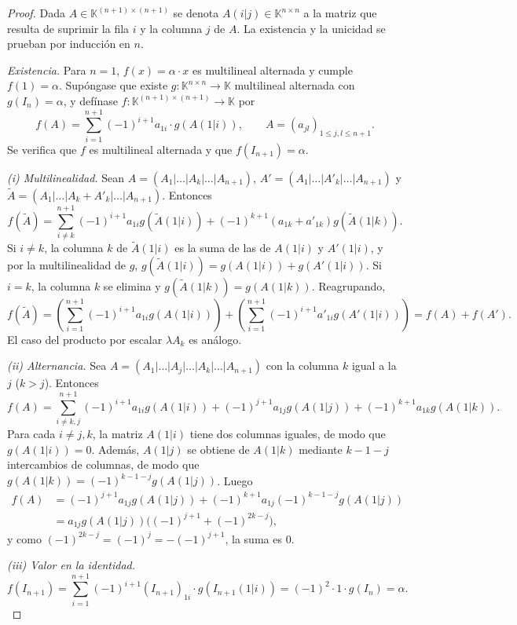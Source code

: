 \documentclass[11pt, a4paper]{article}
\begin{document}
\begin{proof}
Dada $A \in \mathbb{K}^{(n+1) \times (n+1)}$ se denota $A(i|j) \in \mathbb{K}^{n \times n}$ a la matriz que resulta de suprimir la fila $i$ y la columna $j$ de $A$. La existencia y la unicidad se prueban por inducción en $n$.

\textit{Existencia.} Para $n=1$, $f(x) = \alpha \cdot x$ es multilineal alternada y cumple $f(1) = \alpha$. Supóngase que existe $g: \mathbb{K}^{n \times n} \to \mathbb{K}$ multilineal alternada con $g(I_n) = \alpha$, y defínase $f: \mathbb{K}^{(n+1) \times (n+1)} \to \mathbb{K}$ por
\[
f(A) = \sum_{i=1}^{n+1} (-1)^{i+1} a_{1i} \cdot g(A(1|i)), \qquad A=(a_{jl})_{1 \le j,l \le n+1}.
\]
Se verifica que $f$ es multilineal alternada y que $f(I_{n+1}) = \alpha$.

\textit{(i) Multilinealidad.} Sean $A = (A_1|\dots|A_k|\dots|A_{n+1})$, $A' = (A_1|\dots|A'_k|\dots|A_{n+1})$ y $\tilde{A} = (A_1|\dots|A_k+A'_k|\dots|A_{n+1})$. Entonces
\[
f(\tilde{A}) = \sum_{i \neq k}^{n+1} (-1)^{i+1} a_{1i} g(\tilde{A}(1|i)) + (-1)^{k+1} (a_{1k} + a'_{1k}) g(\tilde{A}(1|k)).
\]
Si $i \neq k$, la columna $k$ de $\tilde{A}(1|i)$ es la suma de las de $A(1|i)$ y $A'(1|i)$, y por la multilinealidad de $g$, $g(\tilde{A}(1|i)) = g(A(1|i)) + g(A'(1|i))$. Si $i = k$, la columna $k$ se elimina y $g(\tilde{A}(1|k)) = g(A(1|k))$. Reagrupando,
\[
f(\tilde{A}) = \left( \sum_{i=1}^{n+1} (-1)^{i+1} a_{1i} g(A(1|i)) \right) + \left( \sum_{i=1}^{n+1} (-1)^{i+1} a'_{1i} g(A'(1|i)) \right) = f(A) + f(A').
\]
El caso del producto por escalar $\lambda A_k$ es análogo.

\textit{(ii) Alternancia.} Sea $A = (A_1|\dots|A_j|\dots|A_k|\dots|A_{n+1})$ con la columna $k$ igual a la $j$ ($k > j$). Entonces
\[
f(A) = \sum_{i \neq k,j}^{n+1} (-1)^{i+1} a_{1i} g(A(1|i)) + (-1)^{j+1} a_{1j} g(A(1|j)) + (-1)^{k+1} a_{1k} g(A(1|k)).
\]
Para cada $i \neq j,k$, la matriz $A(1|i)$ tiene dos columnas iguales, de modo que $g(A(1|i)) = 0$. Además, $A(1|j)$ se obtiene de $A(1|k)$ mediante $k-1-j$ intercambios de columnas, de modo que $g(A(1|k)) = (-1)^{k-1-j} g(A(1|j))$. Luego
\begin{align*}
f(A) &= (-1)^{j+1} a_{1j} g(A(1|j)) + (-1)^{k+1} a_{1j} (-1)^{k-1-j} g(A(1|j)) \\
&= a_{1j} g(A(1|j)) \big( (-1)^{j+1} + (-1)^{2k-j} \big),
\end{align*}
y como $(-1)^{2k-j} = (-1)^{j} = -(-1)^{j+1}$, la suma es $0$.

\textit{(iii) Valor en la identidad.}
\[
f(I_{n+1}) = \sum_{i=1}^{n+1} (-1)^{i+1} (I_{n+1})_{1i} \cdot g(I_{n+1}(1|i)) = (-1)^{2} \cdot 1 \cdot g(I_n) = \alpha.
\]


\end{proof}
\end{document}
